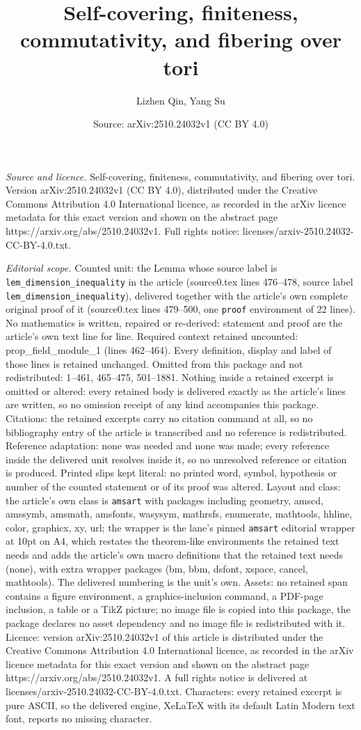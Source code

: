 \documentclass[10pt,a4paper]{amsart}
\title[Self-covering, finiteness, commutativity, and fibering over ]{Self-covering, finiteness, commutativity, and fibering over tori}
\author{Lizhen Qin, Yang Su}
\date{Source: arXiv:2510.24032v1 (CC BY 4.0)}
\begin{document}
\maketitle

\noindent\emph{Source and licence.} Self-covering, finiteness, commutativity, and fibering over tori. Version arXiv:2510.24032v1 (CC BY 4.0), distributed under the Creative Commons Attribution 4.0 International licence, as recorded in the arXiv licence metadata for this exact version and shown on the abstract page https://arxiv.org/abs/2510.24032v1. Full rights notice: licenses/arxiv-2510.24032-CC-BY-4.0.txt.\par\smallskip

\noindent\textit{Editorial scope.} Counted unit: the Lemma whose source label is \texttt{lem\_dimension\_inequality} in the article (source0.tex lines 476--478, source label \texttt{lem\_dimension\_inequality}), delivered together with the article's own complete original proof of it (source0.tex lines 479--500, one \texttt{proof} environment of 22 lines). No mathematics is written, repaired or re-derived: statement and proof are the article's own text line for line. Required context retained uncounted: prop\_field\_module\_1 (lines 462--464). Every definition, display and label of those lines is retained unchanged. Omitted from this package and not redistributed: 1--461, 465--475, 501--1881. Nothing inside a retained excerpt is omitted or altered: every retained body is delivered exactly as the article's lines are written, so no omission receipt of any kind accompanies this package. Citations: the retained excerpts carry no citation command at all, so no bibliography entry of the article is transcribed and no reference is redistributed. Reference adaptation: none was needed and none was made; every reference inside the delivered unit resolves inside it, so no unresolved reference or citation is produced. Printed slips kept literal: no printed word, symbol, hypothesis or number of the counted statement or of its proof was altered. Layout and class: the article's own class is \texttt{amsart} with packages including geometry, amscd, amssymb, amsmath, amsfonts, wasysym, mathrsfs, enumerate, mathtools, hhline, color, graphicx, xy, url; the wrapper is the lane's pinned \texttt{amsart} editorial wrapper at 10pt on A4, which restates the theorem-like environments the retained text needs and adds the article's own macro definitions that the retained text needs (none), with extra wrapper packages (bm, bbm, dsfont, xspace, cancel, mathtools). The delivered numbering is the unit's own. Assets: no retained span contains a figure environment, a graphics-inclusion command, a PDF-page inclusion, a table or a TikZ picture; no image file is copied into this package, the package declares no asset dependency and no image file is redistributed with it. Licence: version arXiv:2510.24032v1 of this article is distributed under the Creative Commons Attribution 4.0 International licence, as recorded in the arXiv licence metadata for this exact version and shown on the abstract page https://arxiv.org/abs/2510.24032v1. A full rights notice is delivered at licenses/arxiv-2510.24032-CC-BY-4.0.txt. Characters: every retained excerpt is pure ASCII, so the delivered engine, XeLaTeX with its default Latin Modern text font, reports no missing character.
\end{document}

